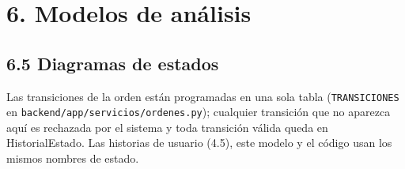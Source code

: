 \section{6. Modelos de análisis}\label{modelos-de-analisis}

\subsection{6.5 Diagramas de estados}\label{diagramas-de-estados}

Las transiciones de la orden están programadas en una sola tabla (\texttt{TRANSICIONES} en
\texttt{backend/app/servicios/ordenes.py}); cualquier transición que no aparezca aquí es rechazada por
el sistema y toda transición válida queda en HistorialEstado. Las historias de usuario (4.5), este modelo
y el código usan los mismos nombres de estado.


